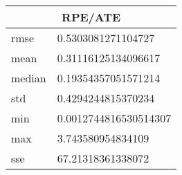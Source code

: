 \begin{table}[!ht] 
 \centering 
 \begin{tabular}{|l|l|} \hline 
 \multicolumn{2}{|c|}{RPE/ATE} \\ \hline 
 rmse & 0.5303081271104727 \\ \hline 
mean & 0.31116125134096617 \\ \hline 
median & 0.19354357051571214 \\ \hline 
std & 0.4294244815370234 \\ \hline 
min & 0.0012744816530514307 \\ \hline 
max & 3.743580954834109 \\ \hline 
sse & 67.21318361338072 \\ \hline 
\end{tabular} 
 \end{table}